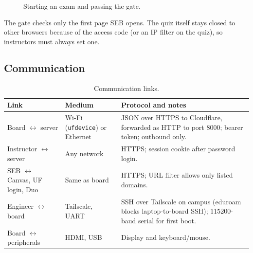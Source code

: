 \documentclass[11pt]{article}
\begin{document}
\begin{figure}[H]
\centering
{}
\caption{Starting an exam and passing the gate.}
\label{fig:gate}
\end{figure}

The gate checks only the first page SEB opens. The quiz itself stays closed to other browsers because of the access code (or an IP filter on the quiz), so instructors must always set one.

\subsection{Communication}
\begin{table}[H]
\centering
\footnotesize
\begin{tabularx}{\textwidth}{@{}p{}p{}X@{}}
\toprule
\textbf{Link} & \textbf{Medium} & \textbf{Protocol and notes} \\
\midrule
Board $\leftrightarrow$ server & Wi-Fi (\texttt{ufdevice}) or Ethernet & JSON over HTTPS to Cloudflare, forwarded as HTTP to port 8000; bearer token; outbound only. \\
Instructor $\leftrightarrow$ server & Any network & HTTPS; session cookie after password login. \\
SEB $\leftrightarrow$ Canvas, UF login, Duo & Same as board & HTTPS; URL filter allows only listed domains. \\
Engineer $\leftrightarrow$ board & Tailscale, UART & SSH over Tailscale on campus (eduroam blocks laptop-to-board SSH); 115200-baud serial for first boot. \\
Board $\leftrightarrow$ peripherals & HDMI, USB & Display and keyboard/mouse. \\
\bottomrule
\end{tabularx}
\caption{Communication links.}
\end{table}
\end{document}
